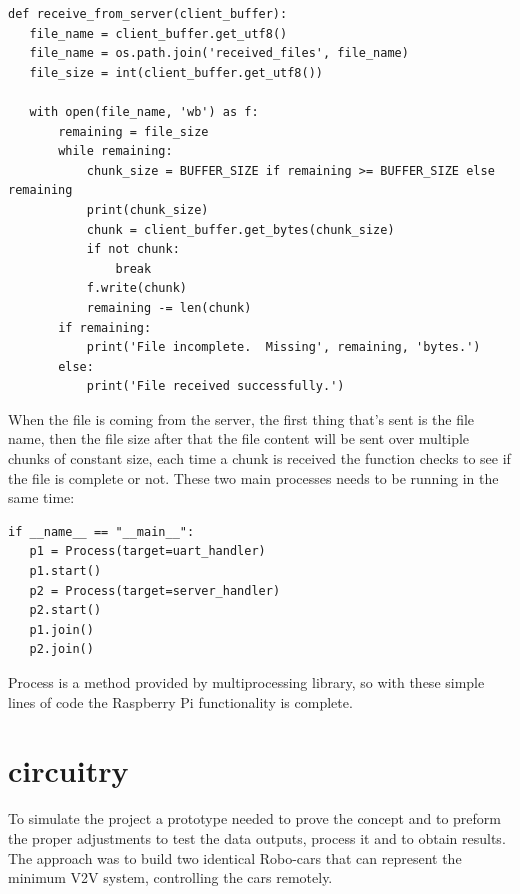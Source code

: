 \begin{lstlisting}
def receive_from_server(client_buffer):
   file_name = client_buffer.get_utf8()
   file_name = os.path.join('received_files', file_name)
   file_size = int(client_buffer.get_utf8())
 
   with open(file_name, 'wb') as f:
       remaining = file_size
       while remaining:
           chunk_size = BUFFER_SIZE if remaining >= BUFFER_SIZE else remaining
           print(chunk_size)
           chunk = client_buffer.get_bytes(chunk_size)
           if not chunk:
               break
           f.write(chunk)
           remaining -= len(chunk)
       if remaining:
           print('File incomplete.  Missing', remaining, 'bytes.')
       else:
           print('File received successfully.')
\end{lstlisting}

When the file is coming from the server, the first thing that’s sent is the file name, then the file size after that the file content will be sent over multiple chunks of constant size, each time a chunk is received the function checks to see if the file is complete or not.
\clearpage
These two main processes needs to be running in the same time:
\begin{lstlisting}
if __name__ == "__main__":
   p1 = Process(target=uart_handler)
   p1.start()
   p2 = Process(target=server_handler)
   p2.start()
   p1.join()
   p2.join()
\end{lstlisting}

Process is a method provided by multiprocessing library, so with these simple lines of code the Raspberry Pi functionality is complete.

\section{circuitry}
To simulate the project a prototype needed to prove the concept and to preform the proper
adjustments to test the data outputs, process it and to obtain
results.
The approach was to build two identical Robo-cars that can
represent the minimum V2V system, controlling the cars remotely.

